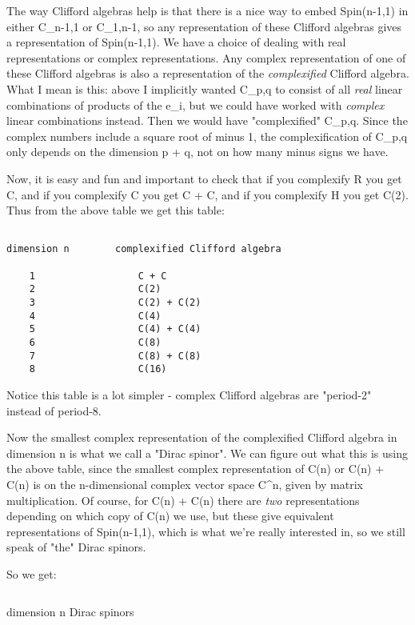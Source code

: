 The way Clifford algebras help is that there is a nice way to
embed Spin(n-1,1) in either C_{n-1,1} or C_{1,n-1}, so any 
representation of these Clifford algebras gives a representation
of Spin(n-1,1).   We have a choice of dealing with real representations or 
complex representations.  Any complex representation of one of
these Clifford algebras is also a representation of the \emph{complexified} 
Clifford algebra.   What I mean is this: above I implicitly wanted
C_{p,q} to consist of all \emph{real} linear combinations of products of 
the e_{i}, but we could have worked with \emph{complex} linear combinations 
instead.  Then we would have "complexified" C_{p,q}.  
Since the
complex numbers include a square root of minus 1, the complexification
of C_{p,q} only depends on the dimension p + q, not on how many minus 
signs we have. 

Now, it is easy and fun and important to check that if you complexify R 
you get C, and if you complexify C you get C + C, and if you complexify 
H you get C(2).  Thus from the above table we get this table: 


\begin{verbatim}

dimension n        complexified Clifford algebra

    1                  C + C
    2                  C(2)
    3                  C(2) + C(2)
    4                  C(4)
    5                  C(4) + C(4)
    6                  C(8)
    7                  C(8) + C(8)
    8                  C(16)

\end{verbatim}
    
Notice this table is a lot simpler - complex Clifford algebras
are "period-2" instead of period-8.  

Now the smallest complex representation of the complexified Clifford
algebra in dimension n is what we call a "Dirac spinor".  We can figure
out what this is using the above table, since the smallest complex 
representation of C(n) or C(n) + C(n) is on the n-dimensional complex
vector space C^{n}, given by matrix multiplication.  Of course, for 
C(n) + C(n) there are \emph{two} representations depending on which copy 
of C(n) we use, but these give equivalent representations of Spin(n-1,1), 
which is what we're really interested in, so we still speak of "the" 
Dirac spinors.

So we get:


$$

dimension n       Dirac spinors 

